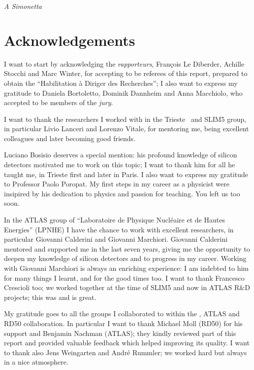 \vspace*{4cm}
\begin{flushright}
{\itshape A Simonetta
}
\end{flushright}



\chapter*{Acknowledgements}

I want to start by acknowledging the {\it rapporteurs}, Fran\c{c}ois Le Diberder, Achille Stocchi and Marc 
Winter, for accepting 
to be referees of this  report, prepared to obtain the  ``Habilitation \`a Diriger des Recherches''; I 
also want to express my gratitude to Daniela Bortoletto, Dominik Dannheim  and Anna Macchiolo, who 
accepted to be members of the {\it jury}.

I want to thank the researchers I worked with in the Trieste \babar\ and SLIM5 group, 
in particular Livio Lanceri and Lorenzo Vitale, for mentoring me, being excellent colleagues  
and later becoming good friends. 

\noindent Luciano Bosisio deserves a special mention: his profound knowledge of silicon detectors 
 motivated me to work on this topic; I want to thank him for all he taught me, in Trieste first and later 
 in Paris.
I also want  to express my gratitude to Professor Paolo Poropat. My first steps in
my career as a physicist were insipired by his dedication to physics and passion for teaching. You left us too soon.

In the ATLAS group of ``Laboratoire de Physique Nucl\'eaire et de Hautes Energies'' (LPNHE) I have
the chance to work with excellent researchers, in particular Giovanni Calderini and Giovanni Marchiori. 
Giovanni Calderini mentored and supported me in the last seven years, giving me the opportunity  
to deepen my knowledge of silicon detectors and to progress in my career. 
Working with Giovanni Marchiori is  always an enriching experience: I am indebted to him for 
many things I learnt, and for the good times too. 
I want to thank Francesco Crescioli too; we worked together at the time of SLIM5 and now in 
ATLAS R\&D projects; this was and is great. 

My gratitude goes to all the groups I collaborated to within the \babar, ATLAS and RD50 collaboration. 
In particular I want to thank Michael Moll (RD50) for his support and Benjamin Nachman (ATLAS); 
they kindly reviewed part of this report and provided valuable feedback which helped improving its quality. 
I want to thank also Jens Weingarten and Andr\'e Rummler; we worked hard but always in a nice 
atmosphere.
 

